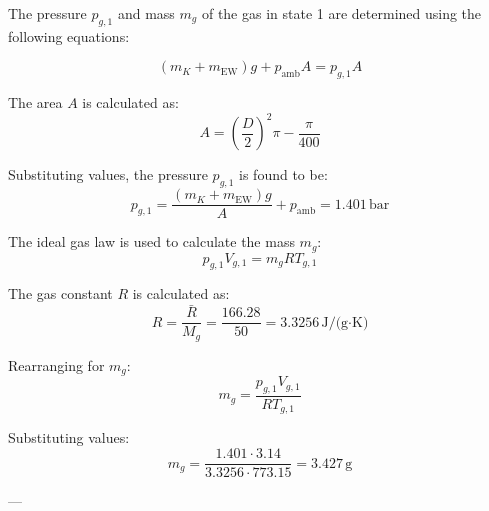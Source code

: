 The pressure \( p_{g,1} \) and mass \( m_g \) of the gas in state 1 are determined using the following equations:  

\[
(m_K + m_{\text{EW}}) g + p_{\text{amb}} A = p_{g,1} A
\]

The area \( A \) is calculated as:  
\[
A = \left(\frac{D}{2}\right)^2 \pi - \frac{\pi}{400}
\]

Substituting values, the pressure \( p_{g,1} \) is found to be:  
\[
p_{g,1} = \frac{(m_K + m_{\text{EW}}) g}{A} + p_{\text{amb}} = 1.401 \, \text{bar}
\]

The ideal gas law is used to calculate the mass \( m_g \):  
\[
p_{g,1} V_{g,1} = m_g R T_{g,1}
\]

The gas constant \( R \) is calculated as:  
\[
R = \frac{\bar{R}}{M_g} = \frac{166.28}{50} = 3.3256 \, \text{J/(g·K)}
\]

Rearranging for \( m_g \):  
\[
m_g = \frac{p_{g,1} V_{g,1}}{R T_{g,1}}
\]

Substituting values:  
\[
m_g = \frac{1.401 \cdot 3.14}{3.3256 \cdot 773.15} = 3.427 \, \text{g}
\]

---